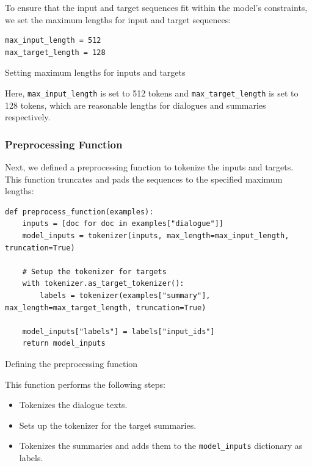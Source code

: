 To ensure that the input and target sequences fit within the model's constraints, we set the maximum lengths for input and target sequences:

\begin{listing}[H]
\begin{verbatim}
max_input_length = 512
max_target_length = 128
\end{verbatim}
\caption{Setting maximum lengths for inputs and targets}
\label{listing:Max_Lengths}
\end{listing}

Here, \texttt{max\_input\_length} is set to 512 tokens and \texttt{max\_target\_length} is set to 128 tokens, which are reasonable lengths for dialogues and summaries respectively.

\subsubsection{Preprocessing Function}

Next, we defined a preprocessing function to tokenize the inputs and targets. This function truncates and pads the sequences to the specified maximum lengths:

\begin{listing}[H]
\begin{verbatim}
def preprocess_function(examples):
    inputs = [doc for doc in examples["dialogue"]]
    model_inputs = tokenizer(inputs, max_length=max_input_length, truncation=True)

    # Setup the tokenizer for targets
    with tokenizer.as_target_tokenizer():
        labels = tokenizer(examples["summary"], max_length=max_target_length, truncation=True)

    model_inputs["labels"] = labels["input_ids"]
    return model_inputs
\end{verbatim}
\caption{Defining the preprocessing function}
\label{listing:Preprocess_Function}
\end{listing}

This function performs the following steps:
\begin{itemize}
    \item Tokenizes the dialogue texts.
    \item Sets up the tokenizer for the target summaries.
    \item Tokenizes the summaries and adds them to the \texttt{model\_inputs} dictionary as labels.
\end{itemize}

